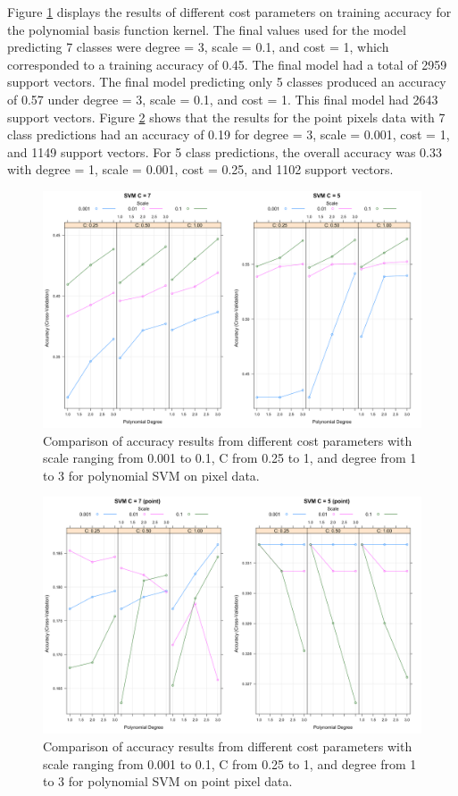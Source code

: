 \documentclass[12pt,twoside]{reedthesis}
\begin{document}
Figure \ref{fig:svm3} displays the results of different cost parameters on training accuracy for the polynomial basis function kernel. The final values used for the model predicting 7 classes were degree = 3, scale = 0.1, and cost = 1, which corresponded to a training accuracy of 0.45. The final model had a total of 2959 support vectors. The final model predicting only 5 classes produced an accuracy of 0.57 under degree = 3, scale = 0.1, and cost = 1. This final model had 2643 support vectors. Figure \ref{fig:svm3c} shows that the results for the point pixels data with 7 class predictions had an accuracy of 0.19 for degree = 3, scale = 0.001, cost = 1, and 1149 support vectors. For 5 class predictions, the overall accuracy was 0.33 with degree = 1, scale = 0.001, cost = 0.25, and 1102 support vectors.
\begin{figure}

{\centering \includegraphics[width=0.9\linewidth]{figure/svm3} 

}

\caption{Comparison of accuracy results from different cost parameters with scale ranging from 0.001 to 0.1, C from 0.25 to 1, and degree from 1 to 3 for polynomial SVM on pixel data.}\label{fig:svm3}
\end{figure}
\begin{figure}

{\centering \includegraphics[width=0.9\linewidth]{figure/svm3c} 

}

\caption{Comparison of accuracy results from different cost parameters with scale ranging from 0.001 to 0.1, C from 0.25 to 1, and degree from 1 to 3 for polynomial SVM on point pixel data.}\label{fig:svm3c}
\end{figure}
\end{document}
